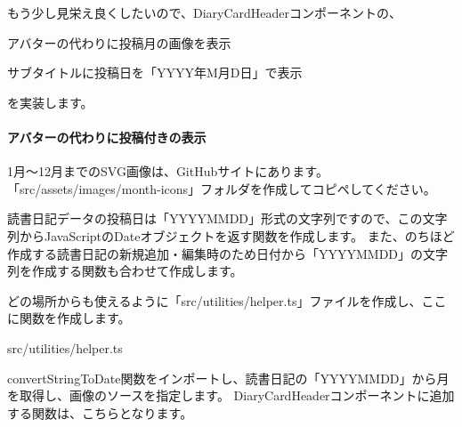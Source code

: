 もう少し見栄え良くしたいので、DiaryCardHeaderコンポーネントの、

\begin{starterenumerate}
\item アバターの代わりに投稿月の画像を表示
\item サブタイトルに投稿日を「YYYY年M月D日」で表示
\end{starterenumerate}

を実装します。

\paragraph*{アバターの代わりに投稿付きの表示}\vspace*{\baselineskip}

1月〜12月までのSVG画像は、GitHubサイトにあります。「src/assets/images/month{-}icons」フォルダを作成してコピペしてください。

\vspace*{\baselineskip}

読書日記データの投稿日は「YYYYMMDD」形式の文字列ですので、この文字列からJavaScriptのDateオブジェクトを返す関数を作成します。
また、のちほど作成する読書日記の新規追加・編集時のため日付から「YYYYMMDD」の文字列を作成する関数も合わせて作成します。

どの場所からも使えるように「src/utilities/helper.ts」ファイルを作成し、ここに関数を作成します。

\def\startercodeblockfontsize{}
\begin{starterprogram}[]{src/utilities/helper.ts}\end{starterprogram}

convertStringToDate関数をインポートし、読書日記の「YYYYMMDD」から月を取得し、画像のソースを指定します。
DiaryCardHeaderコンポーネントに追加する関数は、こちらとなります。

